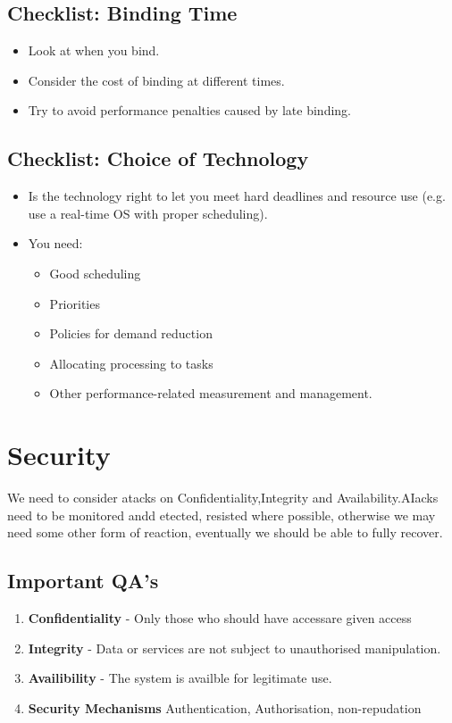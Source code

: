 \documentclass[a4paper]{report}
\begin{document}
\section{Checklist: Binding Time}
\begin{itemize}
\item{Look at when you bind.}
\item{Consider the cost of binding at different times.}
\item{Try to avoid performance penalties caused by late binding.}
\end{itemize}

\section{Checklist: Choice of Technology}
\begin{itemize}
\item{Is the technology right to let you meet hard deadlines and resource use (e.g. use a real-time OS with proper scheduling).}
\item{You need:
\begin{itemize}
\item{Good scheduling}
\item{Priorities}
\item{Policies for demand reduction}
\item{Allocating processing to tasks}
\item{Other performance-related measurement and management.}
\end{itemize}}
\end{itemize}


\chapter{Security}
We need to consider atacks on Confidentiality,Integrity and Availability.AIacks need to be monitored andd etected, resisted where possible, otherwise we may need some other form of reaction, eventually we should be able to fully recover.
\section{Important QA's}
\begin{enumerate}
\item \textbf{Confidentiality} - Only those who should have accessare given access
\item \textbf{Integrity} -  Data or services are not subject to unauthorised manipulation.
\item \textbf{Availibility} -  The system is availble for legitimate use.
\item \textbf{Security Mechanisms} Authentication, Authorisation, non-repudation
\end{enumerate}
\end{document}
